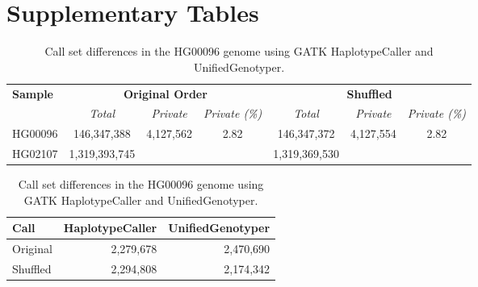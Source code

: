 


\newpage
\section{Supplementary Tables}
\setcounter{table}{0}
\setcounter{page}{1}

\renewcommand{\tablename}{Supplementary Table}


\begin{table}[htb]
\begin{center}
\begin{tabular}{|l|c|c|c||c|c|c|}
\hline
{\bf Sample} & \multicolumn{3}{c||}{\bf Original Order} & \multicolumn{3}{c|}{\bf Shuffled}\\
\cline{2-7}
{\bf } & {\it Total} & {\it Private} & {\it Private (\%)} 
& {\it Total} & {\it Private} & {\it Private (\%)} \\
\hline
HG00096 & 146,347,388 & 4,127,562 & 2.82 & 146,347,372 & 4,127,554 & 2.82\\
HG02107 & 1,319,393,745 & & & 1,319,369,530 & &  \\
\hline
\end{tabular}
\end{center}
\caption{Call set differences in the HG00096 genome using GATK HaplotypeCaller and UnifiedGenotyper.
}
\label{supptab:bwa-map}
\end{table}

\begin{table}[htb]
\begin{center}
\begin{tabular}{|l|r|r|}
\hline
{\bf Call} & {\bf HaplotypeCaller} & {\bf UnifiedGenotyper}\\
\hline
Original & 2,279,678 & 2,470,690\\
Shuffled & 2,294,808 & 2,174,342 \\
\hline
\end{tabular}
\end{center}
\caption{Call set differences in the HG00096 genome using GATK HaplotypeCaller and UnifiedGenotyper.
}
\label{supptab:gatk-orig-shuf-lowcov}
\end{table}



